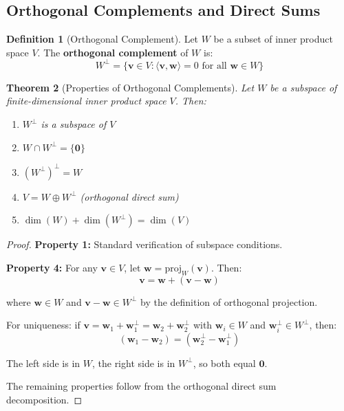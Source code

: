 \documentclass[12pt]{article}
\numberwithin{equation}{section}
\newcommand{\vect}[1]{\boldsymbol{#1}}   %
\theoremstyle{plain}
\newtheorem{theorem}{Theorem}[section]
\theoremstyle{definition}
\newtheorem{definition}[theorem]{Definition}
\theoremstyle{remark}
\begin{document}
\subsection{Orthogonal Complements and Direct Sums}

\begin{definition}[Orthogonal Complement]
Let $W$ be a subset of inner product space $V$. The \textbf{orthogonal complement} of $W$ is:
$$W^{\perp} = \{\vect{v} \in V : \langle \vect{v}, \vect{w} \rangle = 0 \text{ for all } \vect{w} \in W\}$$
\end{definition}

\begin{theorem}[Properties of Orthogonal Complements]
Let $W$ be a subspace of finite-dimensional inner product space $V$. Then:
\begin{enumerate}
\item $W^{\perp}$ is a subspace of $V$
\item $W \cap W^{\perp} = \{\vect{0}\}$
\item $(W^{\perp})^{\perp} = W$
\item $V = W \oplus W^{\perp}$ (orthogonal direct sum)
\item $\dim(W) + \dim(W^{\perp}) = \dim(V)$
\end{enumerate}
\end{theorem}

\begin{proof}
\textbf{Property 1:} Standard verification of subspace conditions.

\textbf{Property 4:} For any $\vect{v} \in V$, let $\vect{w} = \text{proj}_W(\vect{v})$. Then:
$$\vect{v} = \vect{w} + (\vect{v} - \vect{w})$$

where $\vect{w} \in W$ and $\vect{v} - \vect{w} \in W^{\perp}$ by the definition of orthogonal projection.

For uniqueness: if $\vect{v} = \vect{w}_1 + \vect{w}_1^{\perp} = \vect{w}_2 + \vect{w}_2^{\perp}$ with $\vect{w}_i \in W$ and $\vect{w}_i^{\perp} \in W^{\perp}$, then:
$$(\vect{w}_1 - \vect{w}_2) = (\vect{w}_2^{\perp} - \vect{w}_1^{\perp})$$

The left side is in $W$, the right side is in $W^{\perp}$, so both equal $\vect{0}$.

The remaining properties follow from the orthogonal direct sum decomposition.
\end{proof}
\end{document}
